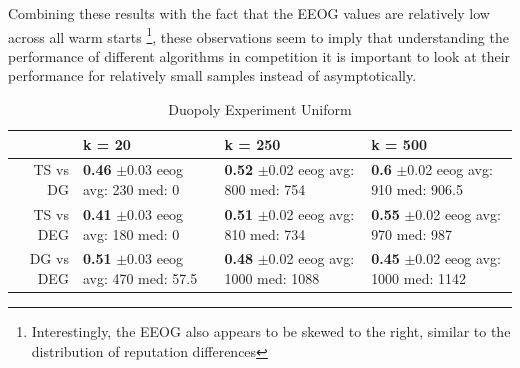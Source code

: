 \documentclass[letterpaper]{article}
\theoremstyle{definition}
\begin{document}
Combining these results with the fact that the EEOG values are relatively low across all warm starts \footnote{Interestingly, the EEOG also appears to be skewed to the right, similar to the distribution of reputation differences}, these observations seem to imply that understanding the performance of different algorithms in competition it is important to look at their performance for relatively small samples instead of asymptotically.

\begin{table}[ht]
\centering
\caption{Duopoly Experiment Uniform}
\begin{tabular}{rlll}
  \hline
 & k = 20 & k = 250 & k = 500 \\
  \hline
TS vs DG & \makecell{\textbf{0.46} $\pm$0.03\\ eeog \\ avg: 230\\ med: 0} & \makecell{\textbf{0.52} $\pm$0.02\\ eeog \\ avg: 800\\ med: 754} & \makecell{\textbf{0.6} $\pm$0.02\\ eeog \\ avg: 910\\ med: 906.5} \\
  TS vs DEG & \makecell{\textbf{0.41} $\pm$0.03\\ eeog \\ avg: 180\\ med: 0} & \makecell{\textbf{0.51} $\pm$0.02\\ eeog \\ avg: 810\\ med: 734} & \makecell{\textbf{0.55} $\pm$0.02\\ eeog \\ avg: 970\\ med: 987} \\
  DG vs DEG & \makecell{\textbf{0.51} $\pm$0.03\\ eeog \\ avg: 470\\ med: 57.5} & \makecell{\textbf{0.48} $\pm$0.02\\ eeog \\ avg: 1000\\ med: 1088} & \makecell{\textbf{0.45} $\pm$0.02\\ eeog \\ avg: 1000\\ med: 1142} \\
   \hline
\end{tabular}
\label{sim_unif}
\end{table}
\end{document}
